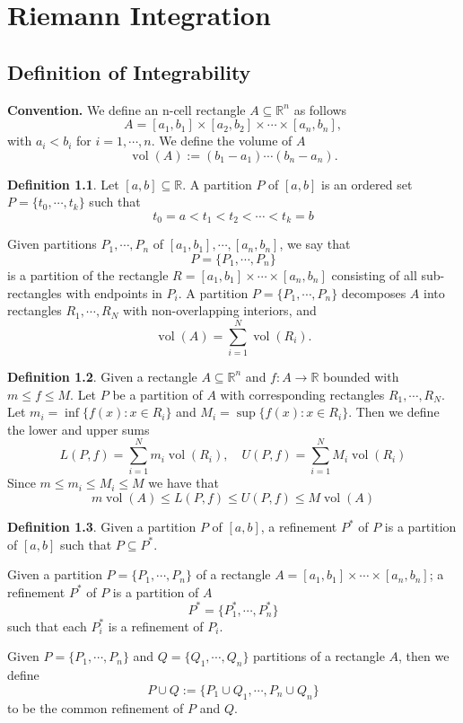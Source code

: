 \documentclass[11pt,openany]{book}
\theoremstyle{plain}
\theoremstyle{definition}
\newtheorem{definition}{Definition}[chapter]
\theoremstyle{remark}
\newcommand{\R}{\mathbb{R}}
\newcommand{\set}[1]{\{ #1 \}}
\begin{document}
\chapter{Riemann Integration}
\section{Definition of Integrability}
\textbf{Convention.} We define an n-cell rectangle $A \subseteq \R^n$ as follows
$$A = [a_1, b_1] \times [a_2, b_2] \times \cdots \times [a_n, b_n],$$
with $a_i<b_i$ for $i=1,\cdots,n$.
We define the volume of $A$ 
$$\operatorname{vol} (A) := (b_1 - a_1) \cdots (b_n - a_n).$$

\begin{definition}
    Let $[a,b] \subseteq \R$. A partition $P$ of $[a,b]$ is an ordered set 
    $P = \set{t_0, \cdots, t_k}$
    such that 
    $$t_0 = a < t_1 < t_2 < \cdots < t_k = b$$

    Given partitions $P_1, \cdots, P_n$ of $[a_1, b_1], \cdots, [a_n, b_n]$, we say that 
    $$P = \set{P_1, \cdots, P_n}$$
    is a partition of the rectangle $R = [a_1, b_1] \times \cdots \times [a_n, b_n]$ consisting of all sub-rectangles with endpoints in $P_i$.
    A partition $P = \set{P_1, \cdots, P_n}$ decomposes $A$ into rectangles $R_1, \cdots, R_N$ with non-overlapping interiors, and 
    $$\operatorname{vol} (A) = \sum_{i=1}^N \operatorname{vol} (R_i).$$
\end{definition}

    \begin{definition}
     Given a rectangle $A \subseteq \R^n$ and $f \colon A \to \R$ bounded with $m \le f \le M$.
    Let $P$ be a partition of $A$ with corresponding rectangles $R_1, \cdots, R_N$. 
    Let $m_i = \inf \set{f(x) \colon x \in R_i}$ and $M_i = \sup \set{f(x) \colon x \in R_i}$. Then we define the lower and upper sums 
    $$L(P, f) = \sum_{i=1}^N m_i \operatorname{vol} (R_i), \quad U(P, f) = \sum_{i=1}^N M_i \operatorname{vol} (R_i)$$
    Since $m \le m_i \le M_i \le M$ we have that 
    $$m \operatorname{vol} (A) \le L(P, f) \le U(P, f) \le M \operatorname{vol} (A)$$
\end{definition}

\begin{definition}
    Given a partition $P$ of $[a,b]$, a refinement $P^*$ of $P$ is a partition of $[a,b]$ such that 
    $P \subseteq P^*$. 

    Given a partition $P = \set{P_1, \cdots, P_n}$ of a rectangle $A = [a_1, b_1] \times \cdots \times [a_n, b_n]$; a 
    refinement $P^*$ of $P$ is a partition of $A$ 
    $$P^* = \set{P_1^*, \cdots, P^*_n}$$
    such that each $P_i^*$ is a refinement of $P_i$. 

    Given $P = \set{P_1, \cdots, P_n}$ and $Q = \set{Q_1, \cdots, Q_n}$ partitions of a rectangle $A$, then we define 
    $$P \cup Q := \set{P_1 \cup Q_1, \cdots, P_n \cup Q_n}$$
    to be the common refinement of $P$ and $Q$.
\end{definition}
\end{document}
